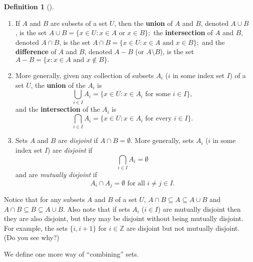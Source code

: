 \documentclass[10pt,]{book}
\newcommand{\terminology}[1]{\textbf{#1}}
\theoremstyle{plain}
\theoremstyle{definition}
\newtheorem{definition}[theorem]{Definition}
\theoremstyle{definition}
\theoremstyle{definition}
\theoremstyle{definition}
\numberwithin{equation}{section}
\def\Z{\mathbb{Z}}
\begin{document}
\begin{definition}[{}]\label{definition-6}
\label{notation-17}
\label{notation-18}
\label{notation-19}
\label{notation-20}
\label{notation-21}
\leavevmode%
\begin{enumerate}
\item\hypertarget{li-6}{}If \(A\) and \(B\) are subsets of a set \(U\), then the \terminology{union} of \(A\) and \(B\), denoted \(A\cup B\), is the set \(A\cup B=\{x\in U : x\in A \text{ or }  x\in B\};\) the \terminology{intersection} of \(A\) and \(B\), denoted \(A\cap B\), is the set \(A\cap B=\{x \in U: x\in A \text{ and }  x\in B\};\) and the \terminology{difference} of \(A\) and \(B\), denoted \(A-B\) (or \(A\setminus B\)), is the set \(A-B=\{x: x\in A \text{ and }  x\not\in B\}.\)%
\item\hypertarget{li-7}{}More generally, given any collection of subsets \(A_i\) (\(i\) in some index set \(I\)) of a set \(U\), the \terminology{union} of the \(A_i\) is%
\begin{equation*}
\bigcup_{i\in I}A_i=\{x\in U: x\in A_i \text{ for some }  i\in I\},
\end{equation*}
and the \terminology{intersection} of the \(A_i\) is%
\begin{equation*}
\bigcap_{i\in I}A_i=\{x\in U: x\in A_i \text{ for every }  i\in I\}.
\end{equation*}
%
\item\hypertarget{li-8}{}Sets \(A\) and \(B\) are \emph{disjoint} if \(A\cap B=\emptyset\).  More generally, sets \(A_i\) (\(i\) in some index set \(I\)) are \emph{disjoint} if%
\begin{equation*}
\bigcap_{i\in I}A_i=\emptyset
\end{equation*}
and are \emph{mutually disjoint} if%
\begin{equation*}
A_i\cap A_j=\emptyset \text{ for all } i\neq j \in I. 
\end{equation*}
%
\end{enumerate}
%
\end{definition}
Notice that for any subsets \(A\) and \(B\) of a set \(U\), \(A\cap B \subseteq A \subseteq A\cup B\) and \(A\cap B \subseteq B \subseteq A\cup B\). Also note that if sets \(A_i\) (\(i \in I\)) are mutually disjoint then they are also disjoint, but they may be disjoint without being mutually disjoint. For example, the sets \(\{i, i+1\}\) for \(i\in \Z\) are disjoint but not mutually disjoint. (Do you see why?)%
\par
We define one more way of ``combining'' sets.%
\end{document}
